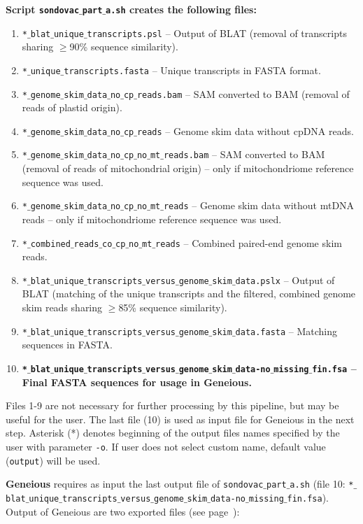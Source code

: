 \documentclass[a4paper, 11pt, twoside]{article}
\begin{document}
\textbf{Script \texttt{sondovac$\_$part$\_$a.sh} creates the following files:}

\begin{enumerate}
  \item \texttt{*$\_$blat$\_$unique$\_$transcripts.psl} -- Output of BLAT (removal of transcripts sharing $\geq$90\% sequence similarity).
  \item \texttt{*$\_$unique$\_$transcripts.fasta} -- Unique transcripts in FASTA format.
  \item \texttt{*$\_$genome$\_$skim$\_$data$\_$no$\_$cp$\_$reads.bam} -- SAM converted to BAM (removal of reads of plastid origin).
  \item \texttt{*$\_$genome$\_$skim$\_$data$\_$no$\_$cp$\_$reads} -- Genome skim data without cpDNA reads.
  \item \texttt{*$\_$genome$\_$skim$\_$data$\_$no$\_$cp$\_$no$\_$mt$\_$reads.bam} -- SAM converted to BAM (removal of reads of mitochondrial origin)  -- only if mitochondriome reference sequence was used.
  \item \texttt{*$\_$genome$\_$skim$\_$data$\_$no$\_$cp$\_$no$\_$mt$\_$reads} -- Genome skim data without mtDNA reads -- only if mitochondriome reference sequence was used.
  \item \texttt{*$\_$combined$\_$reads$\_$co$\_$cp$\_$no$\_$mt$\_$reads} -- Combined paired-end genome skim reads.
  \item \texttt{*$\_$blat$\_$unique$\_$transcripts$\_$versus$\_$genome$\_$skim$\_$data.pslx} -- Output of BLAT (ma\-tching of the unique transcripts and the filtered, combined genome skim reads sharing $\geq$85\% sequence similarity).
  \item \texttt{*$\_$blat$\_$unique$\_$transcripts$\_$versus$\_$genome$\_$skim$\_$data.fasta} -- Matching sequences in FASTA.
  \item \textbf{\texttt{*$\_$blat$\_$unique$\_$transcripts$\_$versus$\_$genome$\_$skim$\_$data-no$\_$missing$\_$fin.fsa} -- Final FASTA sequences for usage in Geneious.}
\end{enumerate}

Files 1-9 are not necessary for further processing by this pipeline, but may be useful for the user. The last file (10) is used as input file for Geneious in the next step. Asterisk (*) denotes beginning of the output files names specified by the user with parameter \texttt{-o}. If user does not select custom name, default value (\texttt{output}) will be used.

\textbf{Geneious} requires as input the last output file of \texttt{sondovac$\_$part$\_$a.sh} (file 10: \texttt{*$\_$blat$\_$\allowbreak unique$\_$\allowbreak transcripts$\_$\allowbreak versus$\_$\allowbreak genome$\_$\allowbreak skim$\_$\allowbreak data-no$\_$\allowbreak missing$\_$\allowbreak fin.fsa}). Output of Geneious are two exported files (see page~\pageref{geneious}):
\end{document}
